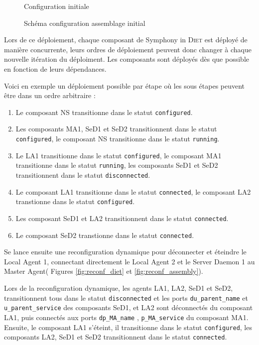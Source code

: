 \documentclass{article}
\newcommand{\cf}{\emph{\text{cf }}\xspace}
\newcommand{\diet}{\textsc{Diet}\xspace} %
\newcommand{\ma}{Master Agent\xspace}
\newcommand{\la}{Local Agent\xspace}
\newcommand{\sed}{Server Daemon\xspace}
\newcommand{\symphonyind}{Symphony in \diet} %
\begin{document}
\begin{figure}[h!]
\centering
	
\caption{Configuration initiale}
\label{fig:conf_diet}
\end{figure}

\begin{figure}[h!]
\centering
	
\caption{Schéma configuration assemblage initial}
\label{fig:conf_assembly}
\end{figure}

Lors de ce déploiement, chaque composant de \symphonyind est déployé de manière
concurrente, leurs ordres de déploiement peuvent donc changer à chaque nouvelle
itération du déploiment. Les composants sont déployés dès que possible en
fonction de leurs dépendances.

Voici en exemple un déploiement possible par étape où les sous étapes peuvent
être dans un ordre arbitraire :
\begin{enumerate}
	\item Le composant NS transitionne dans le statut \texttt{configured}.
	\item Les composants MA1, SeD1 et SeD2 transitionnent dans le statut
	\texttt{configured}, le composant NS transitionne dans le statut
	\texttt{running}.
	\item Le LA1 transitionne dans le statut \texttt{configured}, le composant
	MA1 transitionne dans le statut \texttt{running}, les composants SeD1 et SeD2
	transitionnent dans le statut \texttt{disconnected}.
	\item Le composant LA1 transitionne dans le statut \texttt{connected}, le
	composant LA2 transtionne dans le statut \texttt{configured}.
	\item Les composant SeD1 et LA2 transitionnent dans le statut
	\texttt{connected}.
	\item Le composant SeD2 transtionne dans le statut \texttt{connected}.
\end{enumerate}


Se lance ensuite une reconfiguration dynamique pour déconnecter et éteindre le
\la 1, connectant directement le \la 2 et le \sed 1 au \ma (\cf Figures
\ref{fig:reconf_diet} et \ref{fig:reconf_assembly}).

Lors de la reconfiguration dynamique, les agents LA1, LA2, SeD1 et SeD2,
transitionnent tous dans le statut \texttt{disconnected} et les ports \og
\texttt{du\_parent\_name} \fg et \og \texttt{u\_parent\_service} \fg des
composants SeD1, et LA2 sont déconnectés du composant LA1, puis connectés aux
ports \og \texttt{dp\_MA\_name} \fg, \og \texttt{p\_MA\_service} \fg du
composant MA1. Ensuite, le composant LA1 s'éteint, il transitionne dans le
statut \texttt{configured}, les composants LA2, SeD1 et SeD2 transitionnent
dans le statut \texttt{connected}.
\end{document}
